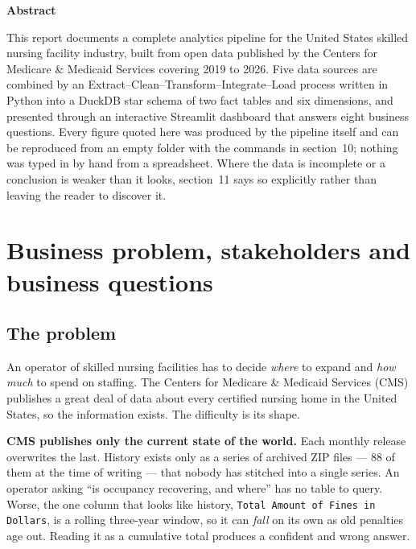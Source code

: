\documentclass[11pt,a4paper]{article}
\newcommand{\sansall}{\sffamily}
\newcommand{\code}[1]{\texttt{#1}}
\begin{document}
\vfill

{\sansall\bfseries\footnotesize\color{src!88!black} Abstract\par}
\vspace{0.3em}
{\sansall\footnotesize
This report documents a complete analytics pipeline for the United States
skilled nursing facility industry, built from open data published by the
Centers for Medicare \& Medicaid Services covering 2019 to 2026. Five data
sources are combined by an Extract--Clean--Transform--Integrate--Load process
written in Python into a DuckDB star schema of two fact tables and six
dimensions, and presented through an interactive Streamlit dashboard that
answers eight business questions. Every figure quoted here was produced by the
pipeline itself and can be reproduced from an empty folder with the commands in
section~10; nothing was typed in by hand from a spreadsheet. Where the data is
incomplete or a conclusion is weaker than it looks, section~11 says so
explicitly rather than leaving the reader to discover it.\par}

\clearpage

\section{Business problem, stakeholders and business questions}

\subsection{The problem}

An operator of skilled nursing facilities has to decide \emph{where} to expand
and \emph{how much} to spend on staffing. The Centers for Medicare \& Medicaid
Services (CMS) publishes a great deal of data about every certified nursing
home in the United States, so the information exists. The difficulty is its
shape.

\textbf{CMS publishes only the current state of the world.} Each monthly
release overwrites the last. History exists only as a series of archived ZIP
files — 88 of them at the time of writing — that nobody has stitched into a
single series. An operator asking ``is occupancy recovering, and where'' has no
table to query. Worse, the one column that looks like history, \code{Total
Amount of Fines in Dollars}, is a rolling three-year window, so it can
\emph{fall} on its own as old penalties age out. Reading it as a cumulative
total produces a confident and wrong answer.
\end{document}
